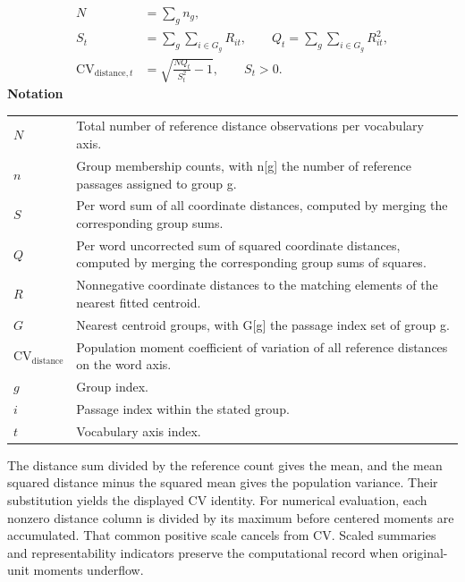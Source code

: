 \documentclass[10pt,letterpaper]{article}
\newcommand{\notlabel}{\noindent\textbf{Notation}\par\nobreak\vspace{4pt}}
\begin{document}
\par\noindent\begin{minipage}{\linewidth}
\begin{equation}\label{eq:groupedcv}
\begin{aligned}N&=\sum_g n_g,\\S_t&=\sum_g\sum_{i\in G_g}R_{it},\qquad Q_t=\sum_g\sum_{i\in G_g}R_{it}^2,\\\mathrm{CV}_{\mathrm{distance},t}&=\sqrt{\frac{NQ_t}{S_t^2}-1},\qquad S_t>0.\end{aligned}
\end{equation}
\notlabel
{\fontsize{8.5}{10.5}\selectfont\setlength{\tabcolsep}{0pt}\renewcommand{\arraystretch}{1.12}
\begin{tabularx}{\linewidth}{@{}p{.14\linewidth}X@{}}
$N$ & Total number of reference distance observations per vocabulary axis.\\
$n$ & Group membership counts, with n[g] the number of reference passages assigned to group g.\\
$S$ & Per word sum of all coordinate distances, computed by merging the corresponding group sums.\\
$Q$ & Per word uncorrected sum of squared coordinate distances, computed by merging the corresponding group sums of squares.\\
$R$ & Nonnegative coordinate distances to the matching elements of the nearest fitted centroid.\\
$G$ & Nearest centroid groups, with G[g] the passage index set of group g.\\
$\mathrm{CV}_{\mathrm{distance}}$ & Population moment coefficient of variation of all reference distances on the word axis.\\
$g$ & Group index.\\
$i$ & Passage index within the stated group.\\
$t$ & Vocabulary axis index.\\
\end{tabularx}}
\par\vspace{2pt}
\end{minipage}\par
The distance sum divided by the reference count gives the mean, and the mean squared distance minus the squared mean gives the population variance. Their substitution yields the displayed CV identity. For numerical evaluation, each nonzero distance column is divided by its maximum before centered moments are accumulated. That common positive scale cancels from CV. Scaled summaries and representability indicators preserve the computational record when original-unit moments underflow.\par
\end{document}
